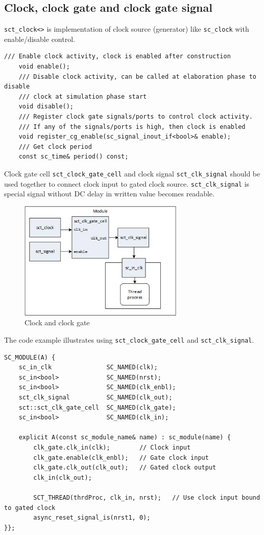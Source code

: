 \subsection{Clock, clock gate and clock gate signal}

{\tt sct\_clock<>} is implementation of clock source (generator) like {\tt sc\_clock} with enable/disable control.

\begin{lstlisting}[style=mycpp]
    /// Enable clock activity, clock is enabled after construction 
    void enable();   
    /// Disable clock activity, can be called at elaboration phase to disable
    /// clock at simulation phase start
    void disable();    
    /// Register clock gate signals/ports to control clock activity.
    /// If any of the signals/ports is high, then clock is enabled
    void register_cg_enable(sc_signal_inout_if<bool>& enable);
    /// Get clock period    
    const sc_time& period() const;
\end{lstlisting}

Clock gate cell {\tt sct\_clock\_gate\_cell} and clock signal {\tt sct\_clk\_signal} should be used together to connect clock input to gated clock source. {\tt sct\_clk\_signal} is special signal without DC delay in written value becomes readable.

\begin{figure}[!htb]
\centering
\includegraphics[width=0.7\textwidth]{pics/ss_clock.jpg}
\caption{Clock and clock gate}
\label{fig:ss_clock}
\end{figure}

The code example illustrates using  {\tt sct\_clock\_gate\_cell} and  {\tt sct\_clk\_signal}.

\begin{lstlisting}[style=mycpp]
SC_MODULE(A) {
    sc_in_clk               SC_NAMED(clk);
    sc_in<bool>             SC_NAMED(nrst); 
    sc_in<bool>             SC_NAMED(clk_enbl);
    sct_clk_signal          SC_NAMED(clk_out);
    sct::sct_clk_gate_cell  SC_NAMED(clk_gate);
    sc_in<bool>             SC_NAMED(clk_in);

    explicit A(const sc_module_name& name) : sc_module(name) {
        clk_gate.clk_in(clk);        // Clock input
        clk_gate.enable(clk_enbl);   // Gate clock input 
        clk_gate.clk_out(clk_out);   // Gated clock output    
        clk_in(clk_out);
        
        SCT_THREAD(thrdProc, clk_in, nrst);   // Use clock input bound to gated clock
        async_reset_signal_is(nrst1, 0);
}};
\end{lstlisting}

